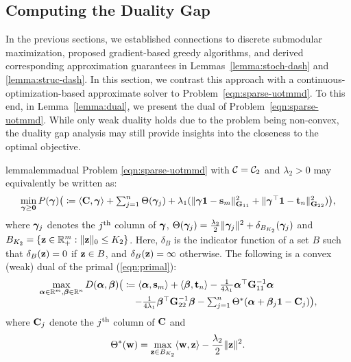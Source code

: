 \subsection{Computing the Duality Gap}
In the previous sections, we established connections to discrete submodular maximization, proposed gradient-based greedy algorithms, and derived corresponding approximation guarantees in Lemmas~\ref{lemma:stoch-dash} and \ref{lemma:struc-dash}. In this section, we contrast this approach with a continuous-optimization-based approximate solver to Problem~\ref{eqn:sparse-uotmmd}. To this end, in Lemma~\ref{lemma:dual}, we present the dual of Problem~\ref{eqn:sparse-uotmmd}. While only weak duality holds due to the problem being non-convex, the duality gap analysis may still provide insights into the closeness to the optimal objective.
\begin{lemmaBox}
\begin{restatable}{lemma}{lemmadual}\label{lemma:dual}
    Problem \ref{eqn:sparse-uotmmd} with $\mathcal{C}=\mathcal{C}_2$ and $\lambda_2>0$ may equivalently be written as: 
    \begin{equation}\label{eqn:primal}
    \begin{array}{l}
        \min\limits_{\bm{\gamma}\geq \mathbf{0}} P(\bm{\gamma})\big(\coloneqq  \langle\mathbf{C},\bm{\gamma}\rangle + \sum_{j=1}^n \Theta(\bm{\gamma}_j) + \lambda_1(\|\bm{\gamma}\mathbf{1}-\mathbf{s}_m\|_{\mathbf{G}_{11}}^2+\|\bm{\gamma}^\top\mathbf{1}-\mathbf{t}_n\|_{\mathbf{G}_{22}}^2)\big),
    \end{array}
    \end{equation}
    where $\bm{\gamma}_j$ denotes the $j^\textup{th}$ column of $\bm{\gamma}$, $\Theta(\bm{\gamma}_j)=\frac{\lambda_2}{2}\|\bm{\gamma}_j\|^2 + \delta_{B_{K_2}}(\bm{\gamma}_j)$ and $B_{K_2} = \{\mathbf{z}\in \mathbb{R}_{+}^m:\|\mathbf{z}\|_0\leq K_2\}$. Here, $\delta_{B}$ is the indicator function of a set $B$ such that $\delta_{B}(\mathbf{z})=0$ if $\mathbf{z}\in B$, and $\delta_{B}(\mathbf{z})=\infty$ otherwise. The following is a convex (weak) dual of the primal (\ref{eqn:primal}):
    \begin{equation}\label{eqn:dual}
    \begin{array}{l}
        \max\limits_{\bm{\alpha}\in\mathbb{R}^m,\bm{\beta}\in\mathbb{R}^n} D(\bm{\alpha},\bm{\beta}) \big(\coloneqq \langle\bm{\alpha},\mathbf{s}_m\rangle + \langle\bm{\beta},\mathbf{t}_n\rangle - \frac{1}{4\lambda_1}\bm{\alpha}^\top \mathbf{G}_{11}^{-1}\bm{\alpha}\\
        \qquad \qquad \qquad \qquad \qquad -\frac{1}{4\lambda_1} \bm{\beta}^\top \mathbf{G}_{22}^{-1}\bm{\beta} -\sum_{j=1}^n \Theta^*(\bm{\alpha}+\bm{\beta}_j\mathbf{1} - \mathbf{C}_j)\big),
    \end{array}
    \end{equation}
    where $\mathbf{C}_j$ denote the $j^\textup{th}$ column of $\mathbf{C}$ and
    \begin{equation}\label{eqn:conjugate}
    \Theta^{*}(\mathbf{w}) = \max_{\mathbf{z}\in B_{K_2}} \langle\mathbf{w},\mathbf{z}\rangle - \frac{\lambda_2}{2}\|\mathbf{z}\|^2 .
    \end{equation}
\end{restatable}
\end{lemmaBox}
